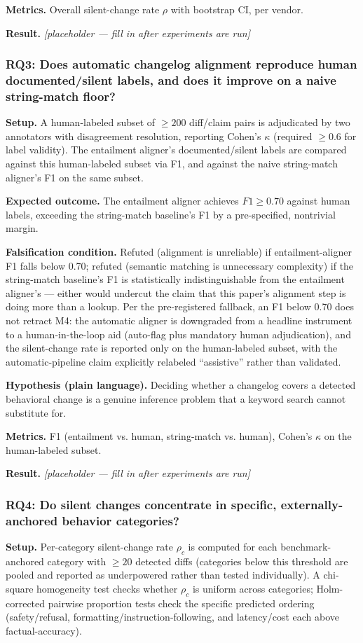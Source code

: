\documentclass[11pt]{article}
\newcommand{\ph}{\textit{[placeholder --- fill in after experiments are run]}}
\begin{document}
\textbf{Metrics.} Overall silent-change rate $\rho$ with bootstrap CI, per vendor.

\textbf{Result.} \ph

\subsubsection{RQ3: Does automatic changelog alignment reproduce human documented/silent labels, and does it improve on a naive string-match floor?}
\textbf{Setup.} A human-labeled subset of $\geq 200$ diff/claim pairs is adjudicated by two annotators with disagreement resolution, reporting Cohen's $\kappa$ (required $\geq 0.6$ for label validity). The entailment aligner's documented/silent labels are compared against this human-labeled subset via F1, and against the naive string-match aligner's F1 on the same subset.

\textbf{Expected outcome.} The entailment aligner achieves $F1 \geq 0.70$ against human labels, exceeding the string-match baseline's F1 by a pre-specified, nontrivial margin.

\textbf{Falsification condition.} Refuted (alignment is unreliable) if entailment-aligner F1 falls below 0.70; refuted (semantic matching is unnecessary complexity) if the string-match baseline's F1 is statistically indistinguishable from the entailment aligner's --- either would undercut the claim that this paper's alignment step is doing more than a lookup. Per the pre-registered fallback, an F1 below 0.70 does not retract M4: the automatic aligner is downgraded from a headline instrument to a human-in-the-loop aid (auto-flag plus mandatory human adjudication), and the silent-change rate is reported only on the human-labeled subset, with the automatic-pipeline claim explicitly relabeled ``assistive'' rather than validated.

\textbf{Hypothesis (plain language).} Deciding whether a changelog covers a detected behavioral change is a genuine inference problem that a keyword search cannot substitute for.

\textbf{Metrics.} F1 (entailment vs. human, string-match vs. human), Cohen's $\kappa$ on the human-labeled subset.

\textbf{Result.} \ph

\subsubsection{RQ4: Do silent changes concentrate in specific, externally-anchored behavior categories?}
\textbf{Setup.} Per-category silent-change rate $\rho_c$ is computed for each benchmark-anchored category with $\geq 20$ detected diffs (categories below this threshold are pooled and reported as underpowered rather than tested individually). A chi-square homogeneity test checks whether $\rho_c$ is uniform across categories; Holm-corrected pairwise proportion tests check the specific predicted ordering (safety/refusal, formatting/instruction-following, and latency/cost each above factual-accuracy).
\end{document}
